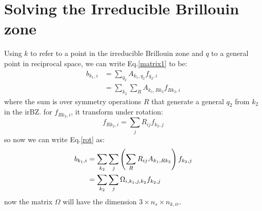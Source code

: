 \documentclass{article}
\begin{document}
\section{Solving the Irreducible Brillouin zone}
Using $k$ to refer to a point in the irreducible Brillouin zone and $q$ to a general point in reciprocal space, 
we can write Eq.\ref{matrix1} to be:
\begin{align}
    b_{k_1,i} &= \sum_{q_2} A_{k_1,q_2} f_{q_2,i} \\
              &= \sum_{k_2} \sum_R A_{k_1,Rk_2} f_{Rk_2,i} \label{rot}
\end{align}
where the sum is over symmetry operations $R$ that generate a general $q_2$ from $k_2$ in the irBZ. 
for $f_{Rk_2,i}$, it transform under rotation:
\begin{equation}
    f_{Rk_2,i} = \sum_j R_{ij} f_{k_2,j}
\end{equation}
so now we can write Eq.\ref{rot} as:
\begin{align}
    b_{k_1,i} &= \sum_{k_2} \sum_j \left( \sum_R R_{ij} A_{k_1,Rk_2} \right) f_{k_2,j} \notag \\
              &= \sum_{k_2} \sum_j \Omega_{i,k_1,j,k_2} f_{k_2,j} 
\end{align}
now the matrix $\Omega$ will have the dimension $3 \times n_s \times n_{k,ir}$.
\end{document}
